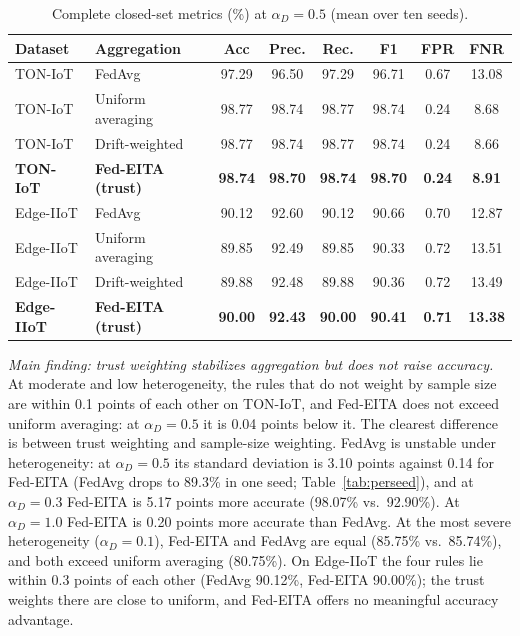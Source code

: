 \documentclass[pdflatex,sn-mathphys-num]{sn-jnl}
\newcommand{\Rtwo}{\color{blue}}
\begin{document}
{{\begin{table}[!htbp]\centering
\color{black}
\caption{Complete closed-set metrics (\%) at $\alpha_D=0.5$ (mean over ten seeds).}\label{tab:agg_full}
\footnotesize
\setlength{\tabcolsep}{4pt}
\begin{tabular}{llcccccc}\toprule
Dataset & Aggregation & Acc & Prec. & Rec. & F1 & FPR & FNR \\ \midrule
TON-IoT & FedAvg & 97.29 & 96.50 & 97.29 & 96.71 & 0.67 & 13.08 \\
TON-IoT & Uniform averaging & 98.77 & 98.74 & 98.77 & 98.74 & 0.24 & 8.68 \\
TON-IoT & Drift-weighted & 98.77 & 98.74 & 98.77 & 98.74 & 0.24 & 8.66 \\
\textbf{TON-IoT} & \textbf{Fed-EITA (trust)} & \textbf{98.74} & \textbf{98.70} & \textbf{98.74} & \textbf{98.70} & \textbf{0.24} & \textbf{8.91} \\
\midrule
Edge-IIoT & FedAvg & 90.12 & 92.60 & 90.12 & 90.66 & 0.70 & 12.87 \\
Edge-IIoT & Uniform averaging & 89.85 & 92.49 & 89.85 & 90.33 & 0.72 & 13.51 \\
Edge-IIoT & Drift-weighted & 89.88 & 92.48 & 89.88 & 90.36 & 0.72 & 13.49 \\
\textbf{Edge-IIoT} & \textbf{Fed-EITA (trust)} & \textbf{90.00} & \textbf{92.43} & \textbf{90.00} & \textbf{90.41} & \textbf{0.71} & \textbf{13.38} \\
\bottomrule\end{tabular}
\end{table}

\emph{Main finding: trust weighting stabilizes aggregation but does not raise accuracy.} At moderate and low heterogeneity, the rules that do not weight by sample size are within 0.1 points of each other on TON-IoT, and Fed-EITA does not exceed uniform averaging: at $\alpha_D=0.5$ it is 0.04 points below it. The clearest difference is between trust weighting and sample-size weighting. FedAvg is unstable under heterogeneity: at $\alpha_D=0.5$ its standard deviation is {\Rtwo 3.10 points against 0.14} for Fed-EITA (FedAvg drops to 89.3\% in one seed; Table~\ref{tab:perseed}), and at $\alpha_D=0.3$ Fed-EITA is 5.17 points more accurate (98.07\% vs.\ 92.90\%). At $\alpha_D=1.0$ Fed-EITA is 0.20 points more accurate than FedAvg. At the most severe heterogeneity ($\alpha_D=0.1$), Fed-EITA and FedAvg are equal (85.75\% vs.\ 85.74\%), and both exceed uniform averaging (80.75\%). On Edge-IIoT the four rules lie within 0.3 points of each other (FedAvg 90.12\%, Fed-EITA 90.00\%); the trust weights there are close to uniform, and Fed-EITA offers no meaningful accuracy advantage.}
{\color{black}
}}
\end{document}
